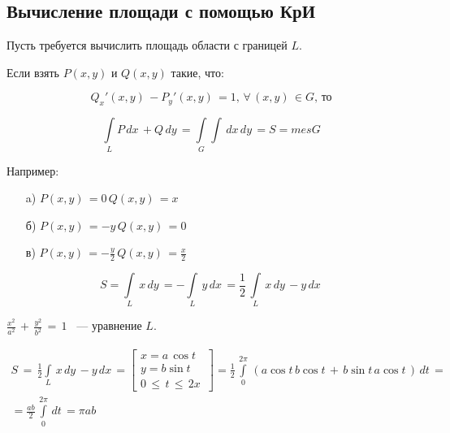 \documentclass[../../main.tex]{subfiles}
\begin{document}
\subsection{Вычисление площади с помощью КрИ}

Пусть требуется вычислить площадь области с границей $L$.

Если взять $P(x, y)$ и $Q(x, y)$ такие, что:

\[
Q_x'(x, y)\, - P_y'(x, y)\, = 1,\, \forall\, (x, y)\, \in G,\, \text{то}
\]

\[
\int\limits_{L} P\, dx\, + Q\, dy\, = \int\limits_{G}\int\, dx\, dy\,
= S = mes G
\]

Например:
	\begin{itemize}
		\item[a)] $ P(x, y)\, = 0\, Q(x, y)\, = x $
		\item[б)] $ P(x, y)\, = -y\, Q(x, y)\, = 0 $
		\item[в)] $ P(x, y)\, = -\frac{y}{2}\, Q(x, y)\, = \frac{x}{2} $
	\end{itemize}

\[
S = \int\limits_{L}\, x\, dy\, =
- \int\limits_{L}\, y\, dx\, =
\frac{1}{2}\, \int\limits_{L}\, x\, dy\, - y\, dx\,
\]

\begin{example}
	$\frac{x^2}{a^2}\, +\, \frac{y^2}{b^2}\, =\, 1$ ~--- уравнение $L$.
	
	\[
	\begin{gathered}
		S\, =\, \frac{1}{2}\int\limits_{L}\, x\, dy\, - y\, dx\, = 
		\left[
			\begin{gathered}
				x = a\, \cos t\, \\
				y = b \sin t\, \\
				0\, \leq\, t\, \leq\, 2x\,
			\end{gathered}
		\right] =
		\frac{1}{2}\, \int\limits_{0}^{2\pi}\, \left( a \cos t\, b \cos t\, +\,
		b \sin t\, a \cos t\, \right)\, dt\, = \\
		= \frac{ab}{2}\, \int\limits_{0}^{2\pi}\, dt\, =
		\pi ab
	\end{gathered}
	\]
\end{example}
\end{document}
